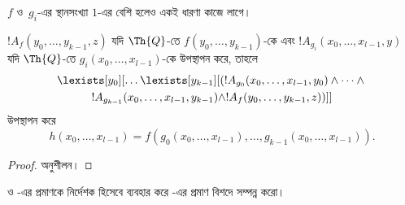 \documentclass[../../../include/open-logic-section]{subfiles}
\begin{document}
$f$ ও~$g_i$-এর স্থানসংখ্যা $1$-এর বেশি হলেও একই ধারণা কাজে লাগে।

\begin{prop}
$!A_f(y_0, \dots, y_{k-1}, z)$ যদি $\Th{Q}$-তে
$f(y_0, \dots, y_{k-1})$-কে এবং
$!A_{g_i}(x_0, \dots, x_{l-1}, y)$ যদি $\Th{Q}$-তে
$g_i(x_0, \dots, x_{l-1})$-কে উপস্থাপন করে, তাহলে
\begin{multline*}
  \lexists[y_0][\dots \lexists[y_{k-1}][(!A_{g_0}(x_0,\dots,x_{l-1},y_0) \land
      \dots \land {}\\
  !A_{g_{k-1}}(x_0,\dots,x_{l-1},y_{k-1}) \land !A_f(y_0,\dots,y_{k-1},z))]]
\end{multline*}
উপস্থাপন করে
\[
h(x_0, \dots, x_{l-1}) = f(g_0(x_0, \dots, x_{l-1}), \dots, g_{k-1}(x_0,
\dots, x_{l-1})).
\]
\end{prop}

\begin{proof}
অনুশীলন।
\end{proof}

\begin{prob}
 ও
-এর প্রমাণকে নির্দেশক হিসেবে ব্যবহার করে
-এর প্রমাণ বিশদে সম্পন্ন করো।
\end{prob}
\end{document}
